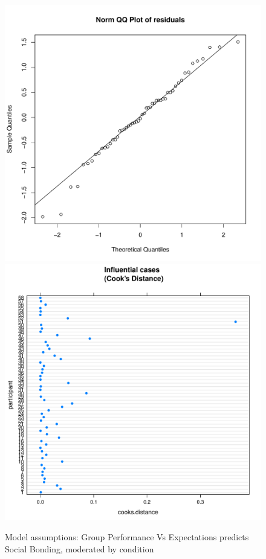 \begin{CJK}{UTF8}{gbsn}
\begin{figure}[htbp]
    \includegraphics[scale =.4]{images/TEM21QQNorm.pdf}
    \includegraphics[scale =.4]{images/TEM21CooksD.pdf}
    \caption{Model assumptions: Group Performance Vs Expectations predicts Social Bonding, moderated by condition}
   \label{fig:M21Assumptions}
\end{figure}




\end{CJK}
